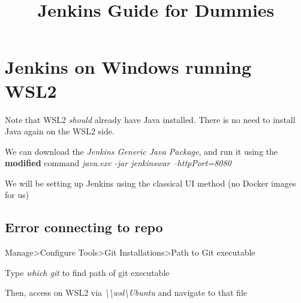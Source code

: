 \documentclass{article}
\title{\vspace{-2cm} Jenkins Guide for Dummies}
\date{\vspace{-5ex}}
\begin{document}
\maketitle

\section{Jenkins on Windows running WSL2}
Note that WSL2 \textit{should} already have Java installed. There is no need to install Java again on the WSL2 side.

We can download the \textit{Jenkins Generic Java Package}, and run it using the \textbf{modified} command \textit{java.exe -jar jenkinswar --httpPort=8080}

We will be setting up Jenkins using the classical UI method (no Docker images for us)

\subsection{Error connecting to repo}
Manage>Configure Tools>Git Installations>Path to Git executable

Type \textit{which git} to find path of git executable

Then, access on WSL2 via \textit{\textbackslash\textbackslash wsl\textbackslash Ubuntu} and navigate to that file
\end{document}

